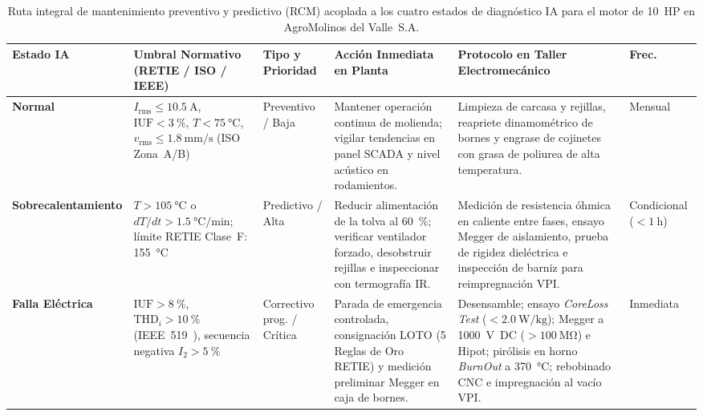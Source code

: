\begin{table}[!t]
\begingroup\setlength{\tabcolsep}{3.4pt}\renewcommand{\arraystretch}{1.06}
\centering\footnotesize
\caption{Ruta integral de mantenimiento preventivo y predictivo (RCM) acoplada a los cuatro estados de diagnóstico IA para el motor de \qty{10}{HP} en AgroMolinos del Valle~S.A.}
\label{tab:ruta_rcm}
\begin{tabularx}{\textwidth}{@{} >{\raggedright\arraybackslash}p{1.95cm} >{\raggedright\arraybackslash}p{3.15cm} >{\raggedright\arraybackslash}p{1.65cm} >{\raggedright\arraybackslash}X >{\raggedright\arraybackslash}X >{\raggedright\arraybackslash}p{1.75cm} @{}}
\toprule
\textbf{Estado IA} & \textbf{Umbral Normativo (RETIE / ISO / IEEE)} & \textbf{Tipo y Prioridad} & \textbf{Acción Inmediata en Planta} & \textbf{Protocolo en Taller Electromecánico} & \textbf{Frec.} \\
\midrule
\textbf{Normal} & $I_{\text{rms}}\le\qty{10.5}{\ampere}$, $\text{IUF}<\qty{3}{\percent}$, $T<\qty{75}{\celsius}$, $v_{\text{rms}}\le\qty{1.8}{\milli\meter\per\second}$ (ISO Zona~A/B) & Preventivo / Baja & Mantener operación continua de molienda; vigilar tendencias en panel SCADA y nivel acústico en rodamientos. & Limpieza de carcasa y rejillas, reapriete dinamométrico de bornes y engrase de cojinetes con grasa de poliurea de alta temperatura. & Mensual \\
\addlinespace[2pt]
\textbf{Sobrecalen\-tamiento} & $T>\qty{105}{\celsius}$ o $dT/dt>\qty{1.5}{\celsius\per\minute}$; límite RETIE Clase~F: \qty{155}{\celsius}~\cite{RETIE2024,RETIE2026} & Predictivo / Alta & Reducir alimentación de la tolva al \qty{60}{\percent}; verificar ventilador forzado, desobstruir rejillas e inspeccionar con termografía IR. & Medición de resistencia óhmica en caliente entre fases, ensayo Megger de aislamiento, prueba de rigidez dieléctrica e inspección de barniz para reimpregnación VPI. & Condicional ($<\qty{1}{\hour}$) \\
\addlinespace[2pt]
\textbf{Falla Eléctrica} & $\text{IUF}>\qty{8}{\percent}$, $\text{THD}_i>\qty{10}{\percent}$ (IEEE~519~\cite{IEEE519}), secuencia negativa $I_2>\qty{5}{\percent}$ & Correctivo prog. / Crítica & Parada de emergencia controlada, consignación LOTO (5 Reglas de Oro RETIE) y medición preliminar Megger en caja de bornes. & Desensamble; ensayo \emph{CoreLoss Test} ($<\qty{2.0}{\watt\per\kilogram}$); Megger a \qty{1000}{\volt}~DC ($>\qty{100}{\mega\ohm}$) e Hipot; pirólisis en horno \emph{BurnOut} a \qty{370}{\celsius}; rebobinado CNC e impregnación al vacío VPI. & Inmediata \\

\end{tabularx}
\end{table}

